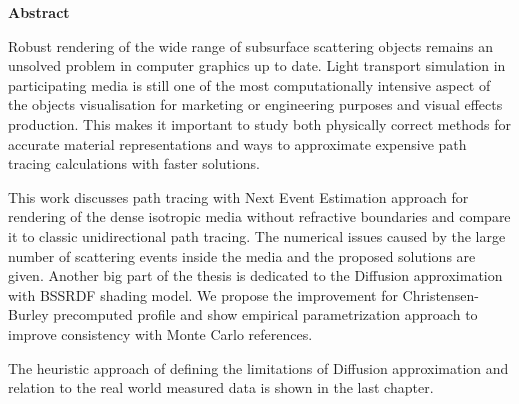 
\clearemptydoublepage
{}
{}

\vspace*{2cm}
\begin{center}
{\Large \textbf{Abstract}}
\end{center}
\vspace{1cm}

Robust rendering of the wide range of subsurface scattering objects remains an unsolved problem in
computer graphics up to date. Light transport simulation in participating media is still one of the
most computationally intensive aspect of the objects visualisation for marketing or engineering
purposes and visual effects production. This makes it important to study both physically
correct methods for accurate material representations and ways to approximate expensive path
tracing calculations with faster solutions. 

This work discusses path tracing with Next Event Estimation approach for rendering of the dense
isotropic media without refractive boundaries and compare it to classic unidirectional path tracing.
The numerical issues caused by the large number of scattering events inside the media and the
proposed solutions are given. Another big part of the thesis is dedicated to the Diffusion
approximation with BSSRDF shading model. We propose the improvement for Christensen-Burley
precomputed profile and show empirical parametrization approach to improve consistency with Monte
Carlo references.

The heuristic approach of defining the limitations of Diffusion approximation and relation to the
real world measured data is shown in the last chapter.
